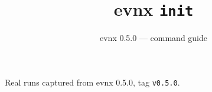 \documentclass[aspectratio=169,10pt]{beamer}
\title{evnx \texttt{init}}
\subtitle{evnx 0.5.0 — command guide}
\date{}
\begin{document}
\begin{frame}[plain]\titlepage
  \begin{center}\footnotesize
  \textcolor{evnxMuted}{Real runs captured from evnx 0.5.0, tag \texttt{v0.5.0}.}
  \end{center}
\end{frame}

\end{document}
